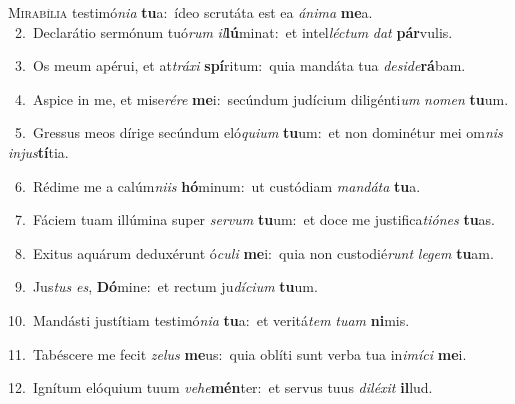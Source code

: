 \lettrine{\initial\textcolor{\initialcolor}{M}}{irabília} testimó\-\textit{ni}\-\textit{a} \textbf{tu}\-a:~\star ídeo scrutáta est ea \textit{á}\-\textit{ni}\textit{ma} \textbf{me}\-a.\\
{\numbfont\textcolor{\numbcolor}{~2.}}~Declarátio sermónum tuó\textit{rum} \textit{il}\-\textbf{lú}minat:~\star et intel\-\textit{léc}\-\textit{tum} \textit{dat} \textbf{pár}\-vulis.\par
{\numbfont\textcolor{\numbcolor}{~3.}}~Os meum apérui, et at\-\textit{trá}\-\textit{xi} \textbf{spí}\-ritum:~\star quia mandáta tua \textit{de}\-\textit{si}\textit{de}\textbf{rá}bam.\par
{\numbfont\textcolor{\numbcolor}{~4.}}~Aspice in me, et mise\-\textit{ré}\-\textit{re} \textbf{me}\-i:~\star secúndum judícium diligénti\textit{um} \textit{no}\-\textit{men} \textbf{tu}\-um.\par
{\numbfont\textcolor{\numbcolor}{~5.}}~Gressus meos dírige secúndum eló\-\textit{qui}\-\textit{um} \textbf{tu}\-um:~\star et non dominétur mei om\textit{nis} \textit{in}\-\textit{jus}\textbf{tí}tia.\par
{\numbfont\textcolor{\numbcolor}{~6.}}~Rédime me a calúm\-\textit{ni}\-\textit{is} \textbf{hó}\-minum:~\star ut custódiam \textit{man}\-\textit{dá}\textit{ta} \textbf{tu}\-a.\par
{\numbfont\textcolor{\numbcolor}{~7.}}~Fáciem tuam illúmina super \textit{ser}\-\textit{vum} \textbf{tu}\-um:~\star et doce me justifica\-\textit{ti}\-\textit{ó}\textit{nes} \textbf{tu}\-as.\par
{\numbfont\textcolor{\numbcolor}{~8.}}~Exitus aquárum deduxérunt ó\-\textit{cu}\-\textit{li} \textbf{me}\-i:~\star quia non custodié\textit{runt} \textit{le}\-\textit{gem} \textbf{tu}\-am.\par
{\numbfont\textcolor{\numbcolor}{~9.}}~Jus\textit{tus} \textit{es}\-, \textbf{Dó}\-mine:~\star et rectum ju\-\textit{dí}\-\textit{ci}\textit{um} \textbf{tu}\-um.\par
{\numbfont\textcolor{\numbcolor}{10.}}~Mandásti justítiam testimó\-\textit{ni}\-\textit{a} \textbf{tu}\-a:~\star et veritá\textit{tem} \textit{tu}\-\textit{am} \textbf{ni}\-mis.\par
{\numbfont\textcolor{\numbcolor}{11.}}~Tabéscere me fecit \textit{ze}\-\textit{lus} \textbf{me}\-us:~\star quia oblíti sunt verba tua in\-\textit{i}\-\textit{mí}\textit{ci} \textbf{me}\-i.\par
{\numbfont\textcolor{\numbcolor}{12.}}~Ignítum elóquium tuum \textit{ve}\-\textit{he}\textbf{mén}ter:~\star et servus tuus \textit{di}\-\textit{lé}\textit{xit} \textbf{il}\-lud.\par
